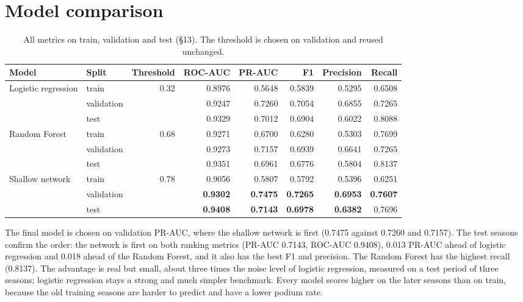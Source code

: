 \documentclass[10pt,a4paper]{article}
\begin{document}
\section{Model comparison}

\begin{table}[H]
\centering\small
\caption{All metrics on train, validation and test (\S13). The threshold is chosen on validation and reused unchanged.}\label{tab:comparison}
\begin{tabular}{llrrrrrr}
\toprule
Model & Split & Threshold & ROC-AUC & PR-AUC & F1 & Precision & Recall \\
\midrule
Logistic regression & train & 0.32 & 0.8976 & 0.5648 & 0.5839 & 0.5295 & 0.6508 \\
 & validation & & 0.9247 & 0.7260 & 0.7054 & 0.6855 & 0.7265 \\
 & test & & 0.9329 & 0.7012 & 0.6904 & 0.6022 & 0.8088 \\
\midrule
Random Forest & train & 0.68 & 0.9271 & 0.6700 & 0.6280 & 0.5303 & 0.7699 \\
 & validation & & 0.9273 & 0.7157 & 0.6939 & 0.6641 & 0.7265 \\
 & test & & 0.9351 & 0.6961 & 0.6776 & 0.5804 & 0.8137 \\
\midrule
Shallow network & train & 0.78 & 0.9056 & 0.5807 & 0.5792 & 0.5396 & 0.6251 \\
 & validation & & \textbf{0.9302} & \textbf{0.7475} & \textbf{0.7265} & \textbf{0.6953} & \textbf{0.7607} \\
 & test & & \textbf{0.9408} & \textbf{0.7143} & \textbf{0.6978} & \textbf{0.6382} & 0.7696 \\
\bottomrule
\end{tabular}
\end{table}

The final model is chosen on validation PR-AUC, where the shallow network is first (0.7475 against 0.7260 and 0.7157). The test seasons confirm the order: the network is first on both ranking metrics (PR-AUC 0.7143, ROC-AUC 0.9408), 0.013 PR-AUC ahead of logistic regression and 0.018 ahead of the Random Forest, and it also has the best F1 and precision. The Random Forest has the highest recall (0.8137). The advantage is real but small, about three times the noise level of logistic regression, measured on a test period of three seasons; logistic regression stays a strong and much simpler benchmark. Every model scores higher on the later seasons than on train, because the old training seasons are harder to predict and have a lower podium rate.
\end{document}

